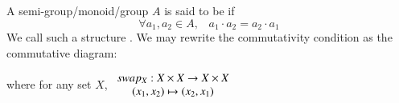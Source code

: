 \documentclass[12pt, a4paper, oneside, openright, titlepage]{book}
\begin{document}
\begin{appendices}
    \begin{defn}
        A semi-group/monoid/group $A$ is said to be  if \begin{equation}
            \forall a_1,a_2 \in A,\;\;\;a_1\cdot a_2 = a_2\cdot a_1
        \end{equation}
        We call such a structure . We may rewrite the commutativity condition as the commutative diagram:
        \begin{center}
        \end{center}
        where for any set $X$, $\begin{array}{c} swap_X:X\times X\rightarrow X\times X \\ (x_1,x_2)\mapsto (x_2,x_1) \end{array}$
    \end{defn}
\end{appendices}
\end{document}
